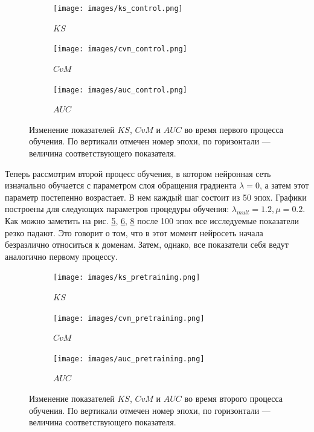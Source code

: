 \documentclass[14pt, a4paper]{extarticle}
\begin{document}
\begin{figure}
\begin{subfigure}{.5\textwidth}
    \centering
	\texttt{[image: images/ks\_control.png]}
	\caption{$KS$}
	\label{figure:control_results_ks}
\end{subfigure}
\begin{subfigure}{.5\textwidth}
	\centering
	\texttt{[image: images/cvm\_control.png]}
	\caption{$CvM$}
	\label{figure:control_results_cvm}
\end{subfigure}
\begin{subfigure}{.5\textwidth}
	\centering
	\texttt{[image: images/auc\_control.png]}
	\caption{$AUC$}
	\label{figure:control_results_auc}
\end{subfigure}
\caption{Изменение показателей $KS$, $CvM$ и $AUC$ во время первого процесса обучения.
По вертикали отмечен номер эпохи, по горизонтали — величина соответствующего показателя.}
\end{figure}

Теперь рассмотрим второй процесс обучения, в котором нейронная сеть изначально обучается с параметром слоя обращения градиента $\lambda = 0$, а затем этот параметр постепенно возрастает. В нем каждый шаг состоит из 50 эпох. Графики построены для следующих параметров процедуры обучения: $\lambda_{mult} = 1.2, \mu = 0.2$. Как можно заметить на рис. \ref{figure:pretraining_results_ks}, \ref{figure:pretraining_results_cvm}, \ref{figure:pretraining_results_auc} после 100 эпох все исследуемые показатели резко падают. Это говорит о том, что в этот момент нейросеть начала безразлично относиться к доменам. Затем, однако, все показатели себя ведут аналогично первому процессу.

\begin{figure}
\begin{subfigure}{.5\textwidth}
	\centering
	\texttt{[image: images/ks\_pretraining.png]}
	\caption{$KS$}
	\label{figure:pretraining_results_ks}
\end{subfigure}
\begin{subfigure}{.5\textwidth}
	\centering
	\texttt{[image: images/cvm\_pretraining.png]}
	\caption{$CvM$}
	\label{figure:pretraining_results_cvm}
\end{subfigure}
\begin{subfigure}{.5\textwidth}
	\centering
	\texttt{[image: images/auc\_pretraining.png]}
	\caption{$AUC$}
	\label{figure:pretraining_results_auc}
\end{subfigure}
\caption{Изменение показателей $KS$, $CvM$ и $AUC$ во время второго процесса обучения.
По вертикали отмечен номер эпохи, по горизонтали — величина соответствующего показателя.}
\end{figure}
\end{document}
